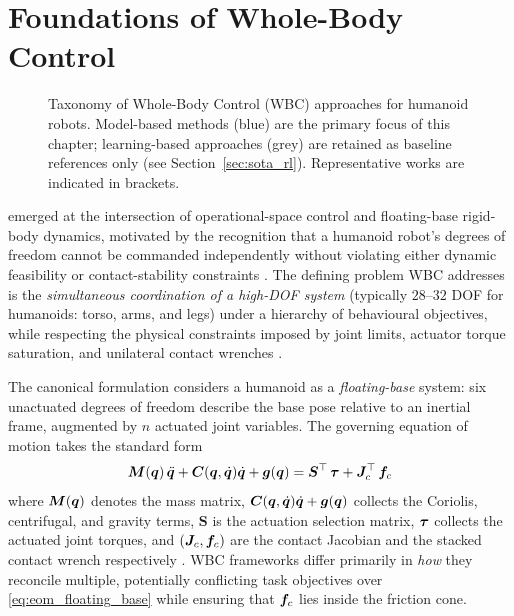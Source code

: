 \section{Foundations of Whole-Body Control}
\label{sec:sota_foundations}

\begin{figure}[htbp]
  \centering
  \resizebox{\textwidth}{!}{}
  \caption{Taxonomy of Whole-Body Control (WBC) approaches for humanoid robots.
           Model-based methods (blue) are the primary focus of this chapter;
           learning-based approaches (grey) are retained as baseline references only
           (see Section~\ref{sec:sota_rl}).
           Representative works are indicated in brackets.}
  \label{fig:wbc_taxonomy}
\end{figure}

\WBC{} emerged at the intersection of operational-space control
\cite{Khatib1987} and floating-base rigid-body dynamics, motivated by the
recognition that a humanoid robot's degrees of freedom cannot be
commanded independently without violating either dynamic feasibility or
contact-stability constraints \cite{Sentis2005}. The defining problem WBC
addresses is the \emph{simultaneous coordination of a high-DOF system}
(typically $28$--$32$ DOF for humanoids: torso, arms, and legs) under a
hierarchy of behavioural objectives, while respecting the physical
constraints imposed by joint limits, actuator torque saturation, and
unilateral contact wrenches \cite{Sentis2005,Wensing2013}.

The canonical formulation considers a humanoid as a \emph{floating-base}
system: six unactuated degrees of freedom describe the base pose relative
to an inertial frame, augmented by $n$ actuated joint variables. The
governing equation of motion takes the standard form
\begin{equation}
  \bm{M}(\bm{q})\,\ddot{\bm{q}} + \bm{C}(\bm{q},\dot{\bm{q}})\dot{\bm{q}} + \bm{g}(\bm{q}) = \bm{S}^{\top}\,\bm{\tau} + \bm{J}_c^{\top}\,\bm{f}_c
  \label{eq:eom_floating_base}
\end{equation}
where $\bm{M}(\bm{q})$ denotes the mass matrix, $\bm{C}(\bm{q},\dot{\bm{q}})\dot{\bm{q}} + \bm{g}(\bm{q})$ collects the Coriolis,
centrifugal, and gravity terms, $\bm{S}$ is the actuation selection
matrix, $\bm{\tau}$ collects the actuated joint torques, and
$(\bm{J}_c,\bm{f}_c)$ are the contact Jacobian and the stacked contact wrench
respectively \cite{Sentis2005,Wensing2013,Koolen2016}. WBC frameworks
differ primarily in \emph{how} they reconcile multiple, potentially
conflicting task objectives over \eqref{eq:eom_floating_base} while
ensuring that $\bm{f}_c$ lies inside the friction cone.

